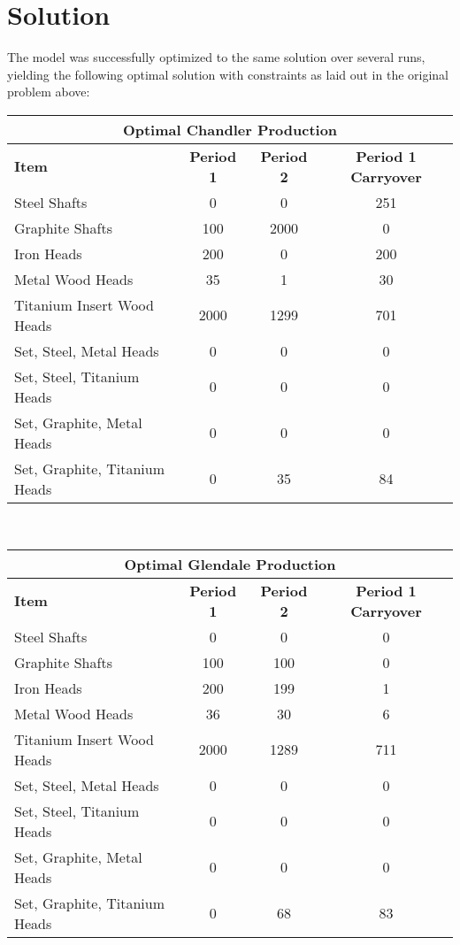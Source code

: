 \documentclass{article}
\begin{document}
\section{Solution}
The model was successfully optimized to the same solution over several runs, yielding the following optimal solution with constraints as laid out in the original problem above:
\\
\noindent
\begin{tabular}{ l c c c }
\hline
\multicolumn{4}{|c|}{Optimal Chandler Production} \\
\hline
\textbf{Item} & \textbf{Period 1} & \textbf{Period 2} & \textbf{Period 1 Carryover} \\
Steel Shafts & 0 & 0 & 251 \\
Graphite Shafts & 100 & 2000 & 0 \\
Iron Heads & 200 & 0 & 200 \\
Metal Wood Heads & 35 & 1 & 30 \\
Titanium Insert Wood Heads & 2000 & 1299 & 701 \\
Set, Steel, Metal Heads & 0 & 0 & 0 \\
Set, Steel, Titanium Heads & 0 & 0 & 0 \\
Set, Graphite, Metal Heads & 0 & 0 & 0 \\
Set, Graphite, Titanium Heads & 0 & 35 & 84\\
\end{tabular}
\vspace{5mm}
\\
\noindent
\begin{tabular}{ l c c c }
\hline
\multicolumn{4}{|c|}{Optimal Glendale Production} \\
\hline
\textbf{Item} & \textbf{Period 1} & \textbf{Period 2} & \textbf{Period 1 Carryover} \\
Steel Shafts & 0 & 0 & 0 \\
Graphite Shafts & 100 & 100 & 0 \\
Iron Heads & 200 & 199 & 1 \\
Metal Wood Heads & 36 & 30 & 6 \\
Titanium Insert Wood Heads & 2000 & 1289 & 711 \\
Set, Steel, Metal Heads & 0 & 0 & 0 \\
Set, Steel, Titanium Heads & 0 & 0 & 0 \\
Set, Graphite, Metal Heads & 0 & 0 & 0 \\
Set, Graphite, Titanium Heads & 0 & 68 & 83\\
\end{tabular}
\end{document}
